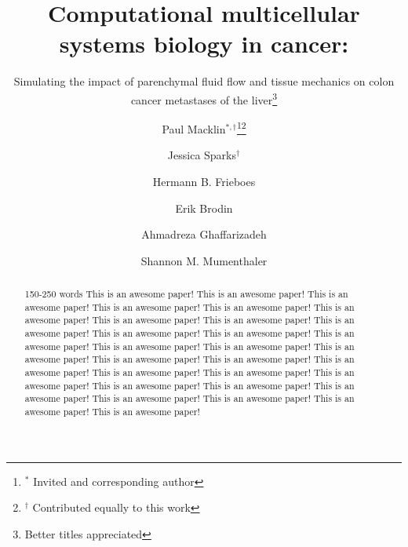 \documentclass[smallextended,natbib,draft]{svjour3}
\begin{document}
\title{Computational multicellular systems biology in cancer:}
\subtitle{Simulating the impact of parenchymal fluid flow and tissue mechanics on colon cancer metastases of 
the liver\footnote{Better titles appreciated}}
\dedication{Dedicated to all the papers we should have written.}

\author{Paul Macklin${}^{*,\dagger}$\thanks{${}^{*}$ Invited and corresponding author}\thanks{${}^{\dagger}$ Contributed equally to this work} \and Jessica Sparks${}^{\dagger}$ \and Hermann B. Frieboes  
\and Erik Brodin 
\and Ahmadreza Ghaffarizadeh  \and Shannon M. Mumenthaler}


\maketitle


\begin{abstract}150-250 words
This is an awesome paper! 
This is an awesome paper! 
This is an awesome paper! 
This is an awesome paper! 
This is an awesome paper! 
This is an awesome paper! 
This is an awesome paper! 
This is an awesome paper! 
This is an awesome paper! 
This is an awesome paper! 
This is an awesome paper! 
This is an awesome paper! 
This is an awesome paper! 
This is an awesome paper! 
This is an awesome paper! 
This is an awesome paper! 
This is an awesome paper! 
This is an awesome paper! 
This is an awesome paper! 
This is an awesome paper! 
This is an awesome paper! 
This is an awesome paper! 
This is an awesome paper! 
This is an awesome paper! 
This is an awesome paper! 
This is an awesome paper! 
This is an awesome paper! 
This is an awesome paper! 
\end{abstract}
\end{document}
